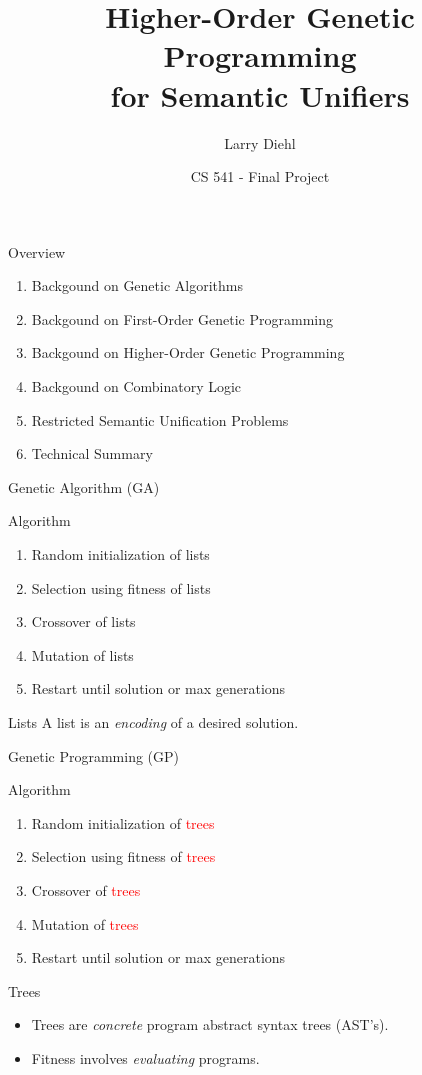 \documentclass[mathserif]{beamer}
\title{Higher-Order Genetic Programming \\for Semantic Unifiers}
\author{Larry Diehl}
\institute{Portland State University}
\date[Fall 2014]
{CS 541 - Final Project}
\newcommand{\diff}[1]{\textcolor{red}{#1}}
\begin{document}
\frame{\titlepage}

\begin{frame}{Overview}

\begin{enumerate}
\item Backgound on Genetic Algorithms
\item Backgound on First-Order Genetic Programming
\item Backgound on Higher-Order Genetic Programming
\item Backgound on Combinatory Logic
\item Restricted Semantic Unification Problems
\item Technical Summary
\end{enumerate}

\end{frame}



\begin{frame}{Genetic Algorithm (GA)}

\begin{block}{Algorithm}
\begin{enumerate}
\item Random initialization of lists
\item Selection using fitness of lists
\item Crossover of lists
\item Mutation of lists
\item Restart until solution or max generations
\end{enumerate}
\end{block}

\begin{block}{Lists}
A list is an \textit{encoding} of a desired solution.
\end{block}

\end{frame}

\begin{frame}{Genetic Programming (GP)}

\begin{block}{Algorithm}
\begin{enumerate}
\item Random initialization of \diff{trees}
\item Selection using fitness of \diff{trees}
\item Crossover of \diff{trees}
\item Mutation of \diff{trees}
\item Restart until solution or max generations
\end{enumerate}
\end{block}

\begin{block}{Trees}
\begin{itemize}
\item Trees are \textit{concrete} program abstract syntax trees (AST's).
\item Fitness involves \textit{evaluating} programs.
\end{itemize}
\end{block}

\end{frame}
\end{document}
